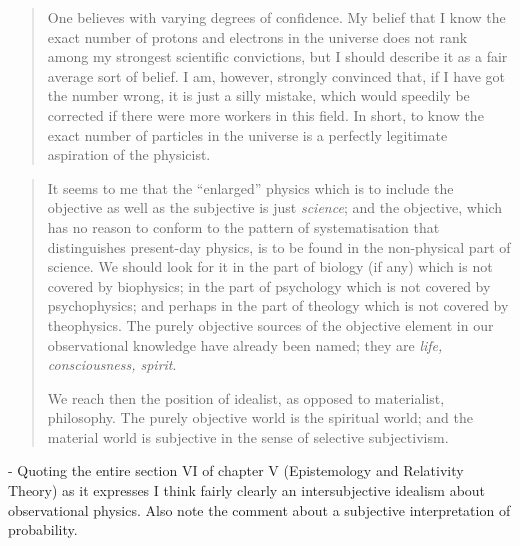 \begin{quote}
    One believes with varying degrees of confidence.  My belief that I know the exact number of protons and electrons in the universe does not rank among my strongest scientific convictions, but I should describe it as a fair average sort of belief.  I am, however, strongly convinced that, if I have got the number wrong, it is just a silly mistake, which would speedily be corrected if there were more workers in this field.  In short, to know the exact number of particles in the universe is a perfectly legitimate aspiration of the physicist.  \citep[p. 171]{Eddington1939}
\end{quote}




\begin{quote}
    It seems to me that the ``enlarged'' physics which is to include the objective as well as the subjective is just \emph{science}; and the objective, which has no reason to conform to the pattern of systematisation that distinguishes present-day physics, is to be found in the non-physical part of science.  We should look for it in the part of biology (if any) which is not covered by biophysics; in the part of psychology which is not covered by psychophysics; and perhaps in the part of theology which is not covered by theophysics.  The purely objective sources of the objective element in our observational knowledge have already been named; they are \emph{life, consciousness, spirit}.
    
    We reach then the position of idealist, as opposed to materialist, philosophy.  The purely objective world is the spiritual world; and the material world is subjective in the sense of selective subjectivism.
    
    \citep[p. 68-69]{Eddington1939}
\end{quote}

- Quoting the entire section VI of chapter V (Epistemology and Relativity Theory) as it expresses I think fairly clearly an intersubjective idealism about observational physics.  Also note the comment about a subjective interpretation of probability.

